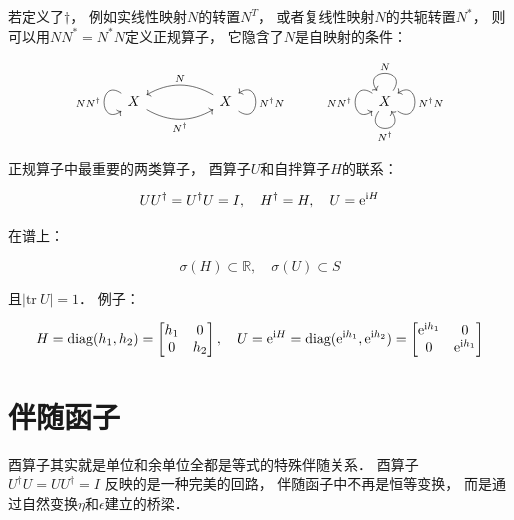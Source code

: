 \documentclass[10pt, openany]{book}
\begin{document}
若定义了$\dagger$，
例如实线性映射$N$的转置$N^T$，
或者复线性映射$N$的共轭转置$N^*$，
则可以用$NN^* = N^*N$定义正规算子，
它隐含了$N$是自映射的条件：

$$
\begin{tikzcd}
X \arrow[rr, "N^\dagger"', bend right] \arrow["NN^\dagger"', loop, distance=2em, in=215, out=145] &  & X \arrow[ll, "N"', bend right] \arrow["N^\dagger N"', loop, distance=2em, in=35, out=325] &  &  &  & X \arrow["N^\dagger N"', loop, distance=2em, in=35, out=325] \arrow["N^\dagger"', loop, distance=2em, in=305, out=235] \arrow["N"', loop, distance=2em, in=125, out=55] \arrow["NN^\dagger"', loop, distance=2em, in=215, out=145]
\end{tikzcd}
$$

正规算子中最重要的两类算子，
酉算子$U$和自拌算子$H$的联系：

$$
UU^\dagger = U^\dagger U = I,\quad 
H^\dagger = H,\quad
U = \text e^{\text i H}
$$

在谱上：

$$
\sigma(H) \subset \mathbb R,\quad 
\sigma(U) \subset S
$$

且$| \text{tr} \ U | = 1$．
例子：

$$
H = \text{diag}(h_1,h_2)
= \begin{bmatrix}
    h_1 & 0 \\
    0 & h_2
\end{bmatrix},\quad
U = \text e^{\text i H}
= \text{diag}(\text e^{\text i h_1},\text e^{\text i h_2})
= \begin{bmatrix}
    \text e^{\text i h_1} & 0 \\
    0 & \text e^{\text i h_1}
\end{bmatrix}
$$

\section{伴随函子}

酉算子其实就是单位和余单位全都是等式的特殊伴随关系．
酉算子 $U^\dagger U = U U^\dagger = I$ 反映的是一种完美的回路，
伴随函子中不再是恒等变换，
而是通过自然变换$\eta$和$\epsilon$建立的桥梁．
\end{document}
